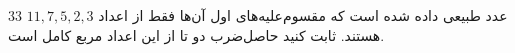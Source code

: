     \p 
$33$
عدد طبیعی داده شده است که مقسوم‌علیه‌های اول آن‌ها فقط از اعداد
$11, 7, 5, 2, 3$
هستند. ثابت کنید حاصل‌ضرب دو تا از این اعداد مربع کامل است.